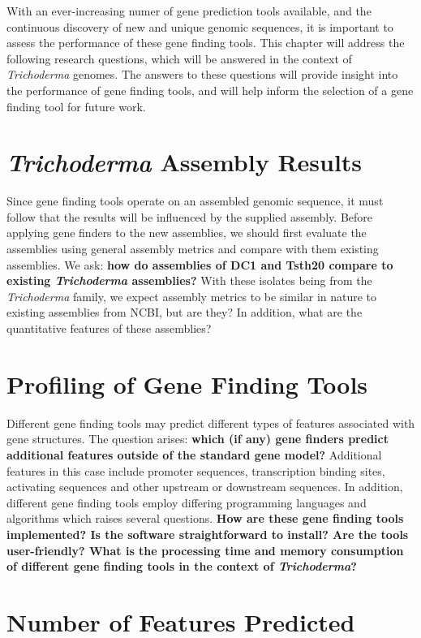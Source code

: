 With an ever-increasing numer of gene prediction tools available, and the continuous discovery of new and unique genomic sequences, it is important to assess the performance of these gene finding tools. This chapter will address the following research questions, which will be answered in the context of \textit{Trichoderma} genomes. The answers to these questions will provide insight into the performance of gene finding tools, and will help inform the selection of a gene finding tool for future work.

\section{\textit{Trichoderma} Assembly Results}
\label{rq:assembly-results}
Since gene finding tools operate on an assembled genomic sequence, it
must follow that the results will be influenced by the supplied
assembly. Before applying gene finders to the new assemblies, we
should first evaluate the assemblies using general assembly metrics and compare with them existing assemblies. We ask: \textbf{how do assemblies of DC1 and
  Tsth20 compare to existing \textit{Trichoderma} assemblies?} With
these isolates being from the \textit{Trichoderma} family, we expect
assembly metrics to be similar in nature to existing assemblies from
NCBI, but are they? In addition, what are the quantitative features of these assemblies?

\section{Profiling of Gene Finding Tools}
Different gene finding tools may predict different types of features
associated with gene structures. The question arises: \textbf{which
  (if any) gene finders predict additional features outside of the
  standard gene model?} Additional features in this case include
promoter sequences, transcription binding sites, activating sequences
and other upstream or downstream sequences. In addition, different
gene finding tools employ differing programming languages and
algorithms which raises several questions. \textbf{How are these gene
  finding tools implemented? Is the software straightforward to
  install? Are the tools user-friendly? What is the processing time
  and memory consumption of different gene finding tools in the
  context of \textit{Trichoderma}?}

\section{Number of Features Predicted}
\label{rq:number-of-features}  

